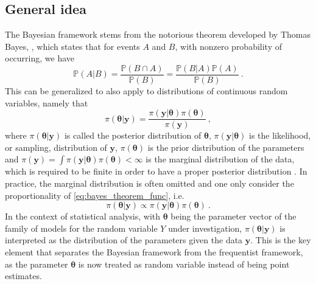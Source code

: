 \subsection{General idea} 
The Bayesian framework stems from the notorious theorem developed by Thomas Bayes, \citep{bayes_1763}, which states that for events $A$ and $B$, with nonzero probability of occurring, we have
\begin{equation}
    \label{eq:bayes_theorem}
    \mathbb{P}(A\lvert B) = \frac{\mathbb{P}(B \cap A)}{\mathbb{P}(B)} = \frac{\mathbb{P}(B\lvert A)\mathbb{P}(A)}{\mathbb{P}(B)} \ .
\end{equation}
This can be generalized to also apply to distributions of continuous random variables, namely that 
\begin{equation}
    \label{eq:bayes_theorem_func}
    \pi(\boldsymbol{\theta} \lvert \mathbf{y}) = \frac{\pi(\mathbf{y} \lvert \boldsymbol{\theta})\pi(\boldsymbol{\theta})}{\pi(\mathbf{y})} \ ,
\end{equation}
where $\pi(\boldsymbol{\theta} \lvert \mathbf{y})$ is called the posterior distribution of $\boldsymbol{\theta}$, $\pi(\mathbf{y} \lvert \boldsymbol{\theta})$ is the likelihood, or sampling, distribution of $\mathbf{y}$, $\pi(\boldsymbol{\theta})$ is the prior distribution of the parameters and $\pi(\mathbf{y}) = \int \pi(\mathbf{y} \lvert \boldsymbol{\theta}) \pi(\boldsymbol{\theta}) < \infty$ is the marginal distribution of the data, which is required to be finite in order to have a proper posterior distribution \citep{gelman2015Bayesian}.
In practice, the marginal distribution is often omitted and one only consider the proportionality of \eqref{eq:bayes_theorem_func}, i.e.
\begin{equation}
    \label{eq:bayes_theorem_func_prop}
    \pi(\boldsymbol{\theta} \lvert \mathbf{y}) \propto \pi(\mathbf{y} \lvert \boldsymbol{\theta})\pi(\boldsymbol{\theta}) \ .
\end{equation}
In the context of statistical analysis, with $\boldsymbol{\theta}$ being the parameter vector of the family of models for the random variable $Y$ under investigation, $\pi(\boldsymbol{\theta} \lvert \mathbf{y})$ is interpreted as the distribution of the parameters given the data $\mathbf{y}$.
This is the key element that separates the Bayesian framework from the frequentist framework, as the parameter $\boldsymbol{\theta}$ is now treated as random variable instead of being point estimates. 

